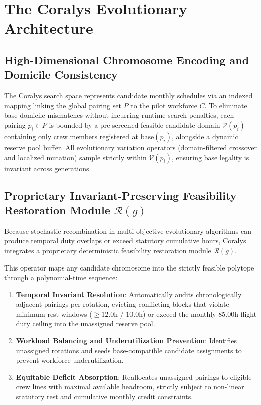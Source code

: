 \documentclass[journal]{IEEEtran}
\begin{document}
\section{The Coralys Evolutionary Architecture}

\subsection{High-Dimensional Chromosome Encoding and Domicile Consistency}

The Coralys search space represents candidate monthly schedules via an indexed mapping linking the global pairing set $P$ to the pilot workforce $C$. To eliminate base domicile mismatches without incurring runtime search penalties, each pairing $p_i \in P$ is bounded by a pre-screened feasible candidate domain $\mathcal{V}(p_i)$ containing only crew members registered at $\text{base}(p_i)$, alongside a dynamic reserve pool buffer. All evolutionary variation operators (domain-filtered crossover and localized mutation) sample strictly within $\mathcal{V}(p_i)$, ensuring base legality is invariant across generations.

\subsection{Proprietary Invariant-Preserving Feasibility Restoration Module $\mathcal{R}(g)$}

Because stochastic recombination in multi-objective evolutionary algorithms can produce temporal duty overlaps or exceed statutory cumulative hours, Coralys integrates a proprietary deterministic feasibility restoration module $\mathcal{R}(g)$. 

This operator maps any candidate chromosome into the strictly feasible polytope through a polynomial-time sequence:
\begin{enumerate}
    \item \textbf{Temporal Invariant Resolution}: Automatically audits chronologically adjacent pairings per rotation, evicting conflicting blocks that violate minimum rest windows ($\ge 12.0$h / $10.0$h) or exceed the monthly $85.00$h flight duty ceiling into the unassigned reserve pool.
    \item \textbf{Workload Balancing and Underutilization Prevention}: Identifies unassigned rotations and seeds base-compatible candidate assignments to prevent workforce underutilization.
    \item \textbf{Equitable Deficit Absorption}: Reallocates unassigned pairings to eligible crew lines with maximal available headroom, strictly subject to non-linear statutory rest and cumulative monthly credit constraints.
\end{enumerate}
\end{document}
